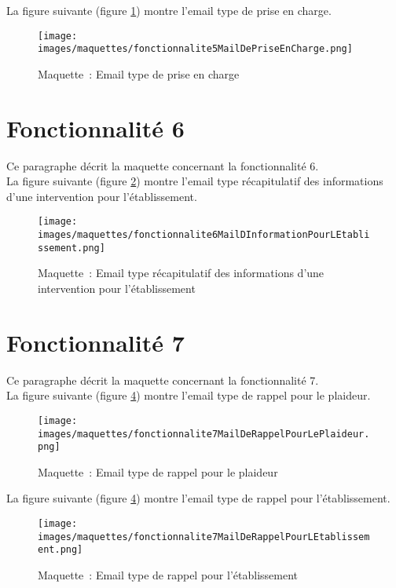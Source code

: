 La figure suivante (figure \ref{maquette5-2}) montre l'email type de prise en charge. \\
\begin{figure}[H]
	\centering
	\texttt{[image: images/maquettes/fonctionnalite5MailDePriseEnCharge.png]}
	\caption{Maquette~: Email type de prise en charge}
	\label{maquette5-2}
\end{figure}


\section{Fonctionnalité 6}
Ce paragraphe décrit la maquette concernant la fonctionnalité 6. \\

La figure suivante (figure \ref{maquette6}) montre l'email type récapitulatif des informations d'une intervention pour l'établissement.
\begin{figure}[H]
	\centering
	\texttt{[image: images/maquettes/fonctionnalite6MailDInformationPourLEtablissement.png]}
	\caption{Maquette~: Email type récapitulatif des informations d'une intervention pour l'établissement}
	\label{maquette6}
\end{figure}




\section{Fonctionnalité 7}
Ce paragraphe décrit la maquette concernant la fonctionnalité 7.\\

La figure suivante (figure \ref{maquette7}) montre l'email type de rappel pour le plaideur.
\begin{figure}[H]
	\centering
	\texttt{[image: images/maquettes/fonctionnalite7MailDeRappelPourLePlaideur.png]}
	\caption{Maquette~: Email type de rappel pour le plaideur}
	\label{maquette7}
\end{figure}

La figure suivante (figure \ref{maquette7}) montre l'email type de rappel pour l'établissement.
\begin{figure}[H]
	\centering
	\texttt{[image: images/maquettes/fonctionnalite7MailDeRappelPourLEtablissement.png]}
	\caption{Maquette~: Email type de rappel pour l'établissement}
	\label{maquette7}
\end{figure}